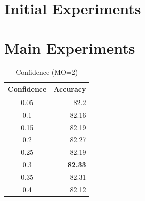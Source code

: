 \documentclass[12pt]{article}
\begin{document}
\section{Initial Experiments}



\section{Main Experiments}




\begin{table}[htbp]
  \centering
  \caption{Confidence (MO=2)}
    \begin{tabular}{c|r}
    \toprule
    \multicolumn{1}{l|}{Confidence} & \multicolumn{1}{l}{Accuracy} \\
    \midrule
    0.05  & 82.2 \\
    0.1   & 82.16 \\
    0.15  & 82.19 \\
    0.2   & 82.27 \\
    0.25  & 82.19 \\
    0.3   & \textbf{82.33} \\
    0.35  & 82.31 \\
    0.4   & 82.12 \\
    \bottomrule
    \end{tabular}%
  \label{tab:addlabel}%
\end{table}%
\end{document}
